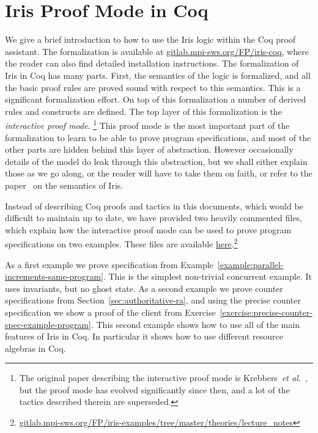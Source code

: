 \section{Iris Proof Mode in Coq}
\label{sec:iris-coq}

We give a brief introduction to how to use the Iris logic within the Coq proof assistant.
The formalization is available at \href{https://gitlab.mpi-sws.org/FP/iris-coq}{gitlab.mpi-sws.org/FP/iris-coq}, where the reader can also find detailed installation instructions.
The formalization of Iris in Coq has many parts.
First, the semantics of the logic is formalized, and all the basic proof rules are proved sound with respect to this semantics.
This is a significant formalization effort.
On top of this formalization a number of derived rules and constructs are defined.
The top layer of this formalization is the \emph{interactive proof mode}.%
\footnote{The original paper describing the interactive proof mode is Krebbers~\emph{et al.}~\cite{Krebbers:IPM}, but the proof mode has evolved significantly since then, and a lot of the tactics described therein are superseded.}
This proof mode is the most important part of the formalization to learn to be able to prove program specifications, and most of the other parts are hidden behind this layer of abstraction.
However occasionally details of the model do leak through this abstraction, but we shall either explain those as we go along, or the reader will have to take them on faith, or refer to the paper~\cite{iris-ground-up} on the semantics of Iris.

Instead of describing Coq proofs and tactics in this documents, which would be difficult to maintain up to date, we have provided two heavily commented files, which explain how the interactive proof mode can be used to prove program specifications on two examples.
These files are available \href{https://gitlab.mpi-sws.org/FP/iris-examples/tree/master/theories/lecture_notes}{here}.\footnote{\href{https://gitlab.mpi-sws.org/FP/iris-examples/tree/master/theories/lecture_notes}{gitlab.mpi-sws.org/FP/iris-examples/tree/master/theories/lecture\_notes}}

As a first example we prove specification from Example~\ref{example:parallel-increments-same-program}.
This is the simplest non-trivial concurrent example.
It uses invariants, but no ghost state.
As a second example we prove counter specifications from Section~\ref{sec:authoritative-ra}, and using the precise counter specification we show a proof of the client from Exercise~\ref{exercise:precise-counter-spec-example-program}.
This second example shows how to use all of the main features of Iris in Coq.
In particular it shows how to use different resource algebras in Coq.

